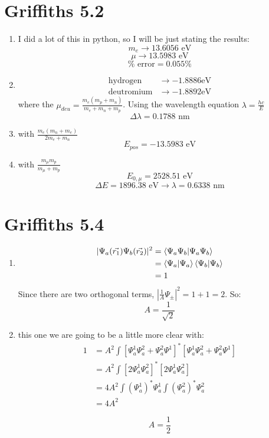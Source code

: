\documentclass[11pt]{article}
\begin{document}
\section*{Griffiths 5.2}
\begin{enumerate}[label=\alph*)]
\item I did a lot of this in python, so I will be just stating the results:
\[m_e \rightarrow 13.6056 \text{ eV}\]
\[\mu \rightarrow 13.5983 \text{ eV}\]
\[\boxed{\% \text{ error} = 0.055\%}\]
\item 
\begin{align*}
\text{hydrogen} & \rightarrow -1.8886 \text{eV}\\
\text{deutromium} & \rightarrow -1.8892 \text{eV}
\end{align*}
where the $\displaystyle{\mu_{deu} = \frac{m_e(m_p + m_n)}{m_e+m_n+m_p}}$. Using the wavelength equation $\displaystyle{\lambda = \frac{hc}{E}}$
\[\boxed{\Delta \lambda = 0.1788 \text{ nm}}\]
\item with $\displaystyle{\frac{m_e(m_n+m_e)}{2m_e + m_n}}$
\[\boxed{E_{pos} = - 13.5983 \text{ eV}}\]
\item with $\displaystyle{\frac{m_\mu m_p}{m_\mu + m_p}}$
\[E_{0,\mu} = 2528.51\text{ eV}\]
\[\Delta E = 1896.38\text{ eV} \rightarrow \boxed{\lambda = 0.6338 \text{ nm}}\]

\end{enumerate}

\newpage

\section*{Griffiths 5.4}
\begin{enumerate}[label=\alph*)]
\item 
\begin{align*}
|\Psi_a(\vec{r_1})\Psi_b(\vec{r_2})|^2 & = \braket{\Psi_a \Psi_b}{\Psi_a \Psi_b}\\
& = \braket{\Psi_a}{\Psi_a}\braket{\Psi_b}{\Psi_b}\\
& = 1
\end{align*}
Since there are two orthogonal terms, $\displaystyle{\left|\frac{1}{A}\Psi_\pm\right|^2 = 1+ 1 = 2}$. So:
\[\boxed{A = \frac{1}{\sqrt{2}}}\]

\item this one we are going to be a little more clear with:
\begin{align*}
1 & = A^2 \int \left[\Psi_a^1 \Psi_a^2 + \Psi_a^2 \Psi^1\right]^*\left[\Psi_a^1 \Psi_a^2 + \Psi_a^2 \Psi^1\right]\\
& = A^2 \int \left[2 \Psi_a^1 \Psi_a^2\right]^*\left[2 \Psi_a^1 \Psi_a^2\right]\\
& = 4 A^2 \int \left(\Psi_a^1\right)^*\Psi_a^1 \int \left(\Psi_a^2\right)^*\Psi_a^2\\
& = 4 A^2
\end{align*}

\[\boxed{A = \frac{1}{2}}\]
\end{enumerate}
\end{document}
